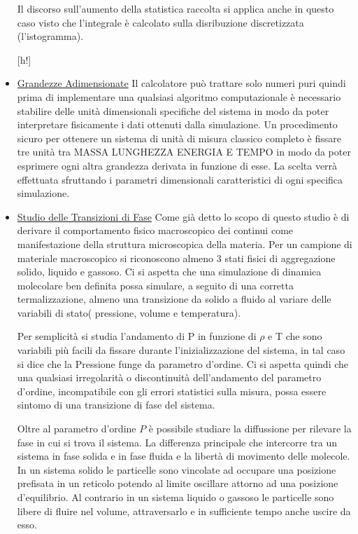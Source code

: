 \documentclass[11pt]{article}
\theoremstyle{plain}
\theoremstyle{remark}
\begin{document}
\begin{itemize}
Il discorso sull'aumento della statistica raccolta si applica anche in questo caso visto che l'integrale è calcolato sulla disribuzione discretizzata (l'istogramma).

[h!]
\item \underline{Grandezze Adimensionate}\newline
Il calcolatore può trattare solo numeri puri quindi prima di implementare una qualsiasi algoritmo computazionale è necessario stabilire delle unità dimensionali specifiche del sistema in modo da poter interpretare fisicamente i dati ottenuti dalla simulazione.
Un procedimento sicuro per ottenere un sistema di unità di misura classico completo è fissare tre unità tra MASSA LUNGHEZZA ENERGIA E TEMPO in modo da poter esprimere ogni altra grandezza derivata in funzione di esse.
La scelta verrà effettuata sfruttando i parametri dimensionali caratteristici di ogni specifica simulazione.


\item \underline{Studio delle Transizioni di Fase}\newline
Come già detto lo scopo di questo studio è di derivare il comportamento fisico macroscopico dei continui come manifestazione della struttura microscopica della materia.
Per un campione di materiale macroscopico si riconoscono almeno 3 stati fisici di aggregazione solido, liquido  e gassoso.
Ci si aspetta che una simulazione di dinamica molecolare ben definita possa simulare, a seguito di una corretta termalizzazione, almeno una transizione da solido a  fluido al variare delle variabili di stato( pressione, volume e temperatura).

Per semplicità si studia l'andamento di P in funzione di $\rho$ e T che sono variabili più facili da fissare durante l'inizializzazione del sistema, in tal caso si dice che la Pressione funge da parametro d'ordine.
Ci si aspetta quindi che una qualsiasi irregolarità o discontinuità dell'andamento del parametro d'ordine, incompatibile con gli errori statistici sulla misura, possa essere sintomo di una transizione di fase del sistema.

Oltre al parametro d'ordine $P$ è possibile studiare la diffussione per rilevare la fase in cui si trova il sistema.
La differenza principale che intercorre tra un sistema in fase solida e in fase fluida e la libertà di movimento delle molecole.
In un sistema solido  le particelle sono vincolate ad occupare una posizione prefisata in un reticolo potendo al limite oscillare attorno ad una posizione d'equilibrio.
Al contrario in un sistema liquido o gassoso le particelle sono libere di fluire nel volume, attraversarlo e in sufficiente tempo anche uscire da esso.


\end{itemize}
\end{document}

